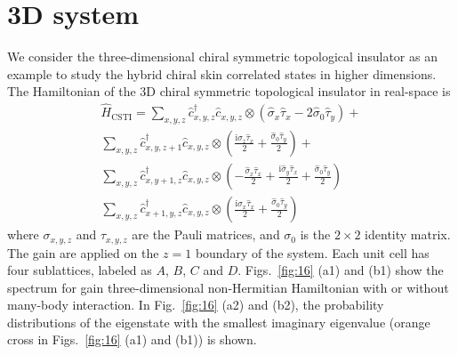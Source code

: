 \documentclass[longbibliography, aps, prx, amsmath, amssymb, amsfonts, twocolumn,superscriptaddress, footinbib]{revtex4-1}
\begin{document}
	\section{3D system~\label{sec:appendC_3D}}

	We consider the three-dimensional chiral symmetric topological insulator as an example to study the hybrid chiral skin correlated states in higher dimensions. The Hamiltonian of the 3D chiral symmetric topological insulator in real-space is
	\begin{equation}
		\begin{split}
			\hat{H}_{\text{CSTI}} = \sum_{x,y,z} \hat{c}_{x,y,z}^{\dagger}\hat{c}_{x,y,z} \otimes (\hat{\sigma}_x \hat{\tau}_x - 2 \hat{\sigma}_0 \hat{\tau}_y) + \\
			\sum_{x,y,z} \hat{c}_{x,y,z+1}^{\dagger}\hat{c}_{x,y,z} \otimes ( \frac{\mathrm{i} \hat{\sigma}_z \hat{\tau}_x}{2} + \frac{\hat{\sigma}_0 \hat{\tau}_y}{2}) + \\
			\sum_{x,y,z} \hat{c}_{x,y+1,z}^{\dagger}\hat{c}_{x,y,z} \otimes (-\frac{\hat{\sigma}_x \hat{\tau}_x}{2} + \frac{\mathrm{i} \hat{\sigma}_y \hat{\tau}_x}{2} + \frac{\hat{\sigma}_0 \hat{\tau}_y}{2})\\
			\sum_{x,y,z} \hat{c}_{x+1,y,z}^{\dagger}\hat{c}_{x,y,z} \otimes ( \frac{\mathrm{i}\hat{\sigma}_x \hat{\tau}_x}{2} + \frac{\hat{\sigma}_0 \hat{\tau}_y}{2} )
		\end{split} %
	\end{equation}
	where $\sigma_{x,y,z}$ and $\tau_{x,y,z}$ are the Pauli matrices, and $\sigma_0$ is the $2\times 2$ identity matrix. The gain are applied on the $z=1$ boundary of the system. Each unit cell has four sublattices, labeled as $A$, $B$, $C$ and $D$. 
	Figs.~\ref{fig:16} (a1) and (b1) show the spectrum for gain three-dimensional non-Hermitian Hamiltonian with or without many-body interaction. 
	In Fig.~\ref{fig:16} (a2) and (b2), the probability distributions of the eigenstate with the smallest imaginary eigenvalue (orange cross in Figs.~\ref{fig:16} (a1) and (b1)) is shown.
\end{document}
